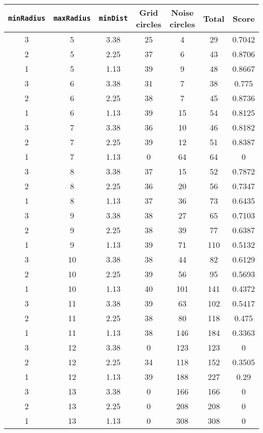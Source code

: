 \documentclass[letterpaper, 12pt]{article}
\begin{document}
\begin{longtable}{|c|c|c|c|c|c|c|}
\hline
\textbf{\texttt{minRadius}} & \textbf{\texttt{maxRadius}} & \textbf{\texttt{minDist}} & \textbf{Grid circles} & \textbf{Noise circles} & \textbf{Total} & \textbf{Score} \\
\hline
3 & 5 & 3.38 & 25 & 4 & 29 & 0.7042 \\
\hline
2 & 5 & 2.25 & 37 & 6 & 43 & 0.8706 \\
\hline
1 & 5 & 1.13 & 39 & 9 & 48 & 0.8667 \\
\hline
3 & 6 & 3.38 & 31 & 7 & 38 & 0.775 \\
\hline
2 & 6 & 2.25 & 38 & 7 & 45 & 0.8736 \\
\hline
1 & 6 & 1.13 & 39 & 15 & 54 & 0.8125 \\
\hline
3 & 7 & 3.38 & 36 & 10 & 46 & 0.8182 \\
\hline
2 & 7 & 2.25 & 39 & 12 & 51 & 0.8387 \\
\hline
1 & 7 & 1.13 & 0 & 64 & 64 & 0 \\
\hline
3 & 8 & 3.38 & 37 & 15 & 52 & 0.7872 \\
\hline
2 & 8 & 2.25 & 36 & 20 & 56 & 0.7347 \\
\hline
1 & 8 & 1.13 & 37 & 36 & 73 & 0.6435 \\
\hline
3 & 9 & 3.38 & 38 & 27 & 65 & 0.7103 \\
\hline
2 & 9 & 2.25 & 38 & 39 & 77 & 0.6387 \\
\hline
1 & 9 & 1.13 & 39 & 71 & 110 & 0.5132 \\
\hline
3 & 10 & 3.38 & 38 & 44 & 82 & 0.6129 \\
\hline
2 & 10 & 2.25 & 39 & 56 & 95 & 0.5693 \\
\hline
1 & 10 & 1.13 & 40 & 101 & 141 & 0.4372 \\
\hline
3 & 11 & 3.38 & 39 & 63 & 102 & 0.5417 \\
\hline
2 & 11 & 2.25 & 38 & 80 & 118 & 0.475 \\
\hline
1 & 11 & 1.13 & 38 & 146 & 184 & 0.3363 \\
\hline
3 & 12 & 3.38 & 0 & 123 & 123 & 0 \\
\hline
2 & 12 & 2.25 & 34 & 118 & 152 & 0.3505 \\
\hline
1 & 12 & 1.13 & 39 & 188 & 227 & 0.29 \\
\hline
3 & 13 & 3.38 & 0 & 166 & 166 & 0 \\
\hline
2 & 13 & 2.25 & 0 & 208 & 208 & 0 \\
\hline
1 & 13 & 1.13 & 0 & 308 & 308 & 0 \\

\end{longtable}
\end{document}

